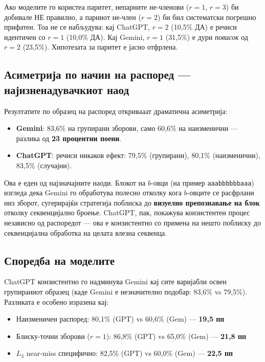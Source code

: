 \documentclass[12pt,a4paper]{article}
\theoremstyle{definition}
\begin{document}
Ако моделите го користеа паритет, непарните не-членови ($r=1$, $r=3$) би добивале НЕ правилно, а парниот не-член ($r=2$) би бил систематски погрешно прифатен. Тоа не се набљудува: кај ChatGPT, $r=2$ (10,5\% ДА) е речиси идентичен со $r=1$ (10,0\% ДА). Кај Gemini, $r=1$ (31,5\%) е дури \textit{повисок} од $r=2$ (23,5\%). Хипотезата за паритет е јасно отфрлена.

\subsection{Асиметрија по начин на распоред --- најизненадувачкиот наод}

Резултатите по образец на распоред откривааат драматична асиметрија:

\begin{itemize}
  \item \textbf{Gemini}: 83,6\% на групирани зборови, само 60,6\% на наизменични --- разлика од \textbf{23 процентни поени}.
  \item \textbf{ChatGPT}: речиси никаков ефект: 79,5\% (групирани), 80,1\% (наизменични), 83,5\% (случајни).
\end{itemize}

Ова е еден од најзначајните наоди. Блокот на $b$-овци (на пример \texttt{aaabbbbbbaaa}) изгледа дека Gemini го обработува полесно отколку кога $b$-овците се расфрлани низ зборот, сугерирајќи стратегија поблиска до \textbf{визуелно препознавање на блок} отколку секвенцијално броење. ChatGPT, пак, покажува конзистентен процес независно од распоредот --- ова е конзистентно со примена на нешто поблиску до секвенцијална обработка на целата влезна секвенца.

\subsection{Споредба на моделите}

ChatGPT конзистентно го надминува Gemini кај сите варијабли освен групираниот образец (каде Gemini е незначително подобар: 83,6\% vs 79,5\%). Разликата е особено изразена кај:

\begin{itemize}
  \item Наизменичен распоред: 80,1\% (GPT) vs 60,6\% (Gem) --- \textbf{19,5 пп}
  \item Блиску-точни зборови ($r=1$): 86,8\% (GPT) vs 65,0\% (Gem) --- \textbf{21,8 пп}
  \item $L_3$ near-miss специфично: 82,5\% (GPT) vs 60,0\% (Gem) --- \textbf{22,5 пп}
\end{itemize}
\end{document}
